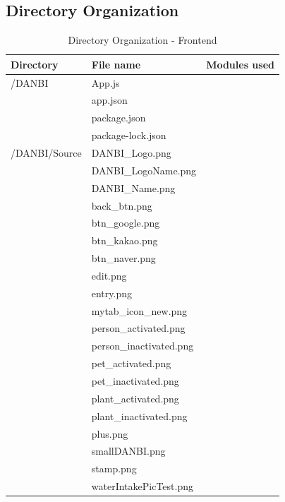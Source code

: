 \documentclass[conference]{IEEEtran}
\begin{document}
\subsection{Directory Organization}
\setlength{\parindent}{2ex}
\begin{table}[h!]

        \begin{threeparttable}
            \caption{Directory Organization - Frontend%
            \label{tab:table5}}    %
            \begin{tabular}{p{2.4cm}p{2.8cm}p{2cm}}
            \toprule
            \bfseries Directory & \bfseries File name & \multicolumn{1}{l}{\bfseries Modules used} \\
            \midrule
            /DANBI 
            & App.js \\
            & app.json\\
            & package.json\\
            & package-lock.json\\
            \hline
            /DANBI/Source
            & DANBI\_Logo.png\\
            & DANBI\_LogoName.png\\
            & DANBI\_Name.png\\
            & back\_btn.png\\
            & btn\_google.png\\
            & btn\_kakao.png\\
            & btn\_naver.png\\
            & edit.png\\
            & entry.png\\
            & mytab\_icon\_new.png\\
            & person\_activated.png\\
            & person\_inactivated.png\\
            & pet\_activated.png\\
            & pet\_inactivated.png\\
            & plant\_activated.png\\
            & plant\_inactivated.png\\
            & plus.png\\
            & smallDANBI.png\\
            & stamp.png\\
            & waterIntakePicTest.png\\

\end{tabular}
\end{threeparttable}
\end{table}
\end{document}
